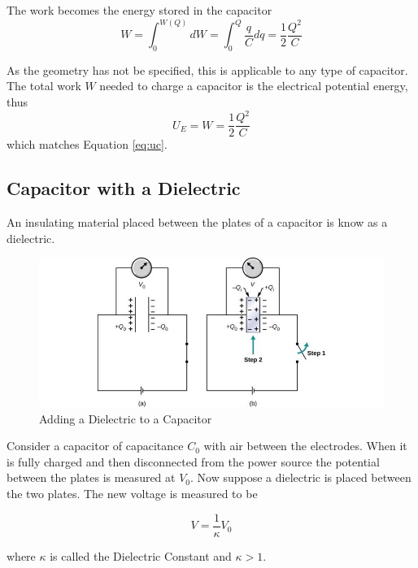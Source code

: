 \documentclass[14pt]{memoir}
\begin{document}
The work becomes the energy stored in the capacitor
\begin{equation}
W = \int_0^{W(Q)} dW = \int_0^Q \frac{q}{C}dq = \frac{1}{2} \frac{Q^2}{C}
\end{equation}

As the geometry has not be specified, this is applicable to any type of capacitor. The total work $W$ needed to charge a capacitor is the electrical potential energy, thus
\begin{equation}
U_E = W = \frac{1}{2} \frac{Q^2}{C}
\end{equation}
which matches Equation \ref{eq:uc}.

\subsection{Capacitor with a Dielectric}

An insulating material placed between the plates of a capacitor is know as a dielectric.

\begin{figure}[H]
\begin{center}
\includegraphics[scale=0.50]{fig/fig_08_17.jpg}
\caption{Adding a Dielectric to a Capacitor}
\label{fig:08_17}
\end{center}
\end{figure}


Consider a capacitor of capacitance $C_0$ with air between the electrodes. When it is fully charged and then disconnected from the power source the potential between the plates is measured at $V_0$. Now suppose a dielectric is placed between the two plates. The new voltage is measured to be

\begin{equation}
V = \frac{1}{\kappa} V_0
\end{equation}

where $\kappa$ is called the Dielectric Constant and $\kappa > 1$.
\end{document}
